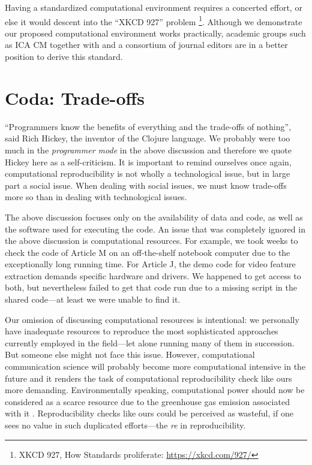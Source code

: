 Having a standardized computational environment requires a concerted effort, or else it would descent into the ``XKCD 927'' problem \footnote{XKCD 927, How Standards proliferate: \url{https://xkcd.com/927/}}. Although we demonstrate our proposed computational environment works practically, academic groups such as ICA CM together with and a consortium of journal editors are in a better position to derive this standard.

\section{Coda: Trade-offs}

``Programmers know the benefits of everything and the trade-offs of nothing'', said Rich Hickey, the inventor of the Clojure language. We probably were too much in the \textit{programmer mode} in the above discussion and therefore we quote Hickey here as a self-criticism. It is important to remind ourselves once again, computational reproducibility is not wholly a technological issue, but in large part a social issue. When dealing with social issues, we must know trade-offs more so than in dealing with technological issues.

The above discussion focuses only on the availability of data and code, as well as the software used for executing the code. An issue that was completely ignored in the above discussion is computational resources. For example, we took weeks to check the code of Article M on an off-the-shelf notebook computer due to the exceptionally long running time. For Article J, the demo code for video feature extraction demands specific hardware and drivers. We happened to get access to both, but nevertheless failed to get that code run due to a missing script in the shared code---at least we were unable to find it. 

Our omission of discussing computational resources is intentional: we personally have inadequate resources to reproduce the most sophisticated approaches currently employed in the field---let alone running many of them in succession. But someone else might not face this issue. However, computational communication science will probably become more computational intensive in the future and it renders the task of computational reproducibility check like ours more demanding. Environmentally speaking, computational power should now be considered as a scarce resource due to the greenhouse gas emission associated with it \parencite[]{Wu:2022}. Reproducibility checks like ours could be perceived as wasteful, if one sees no value in such duplicated efforts---the \textit{re} in reproducibility.

